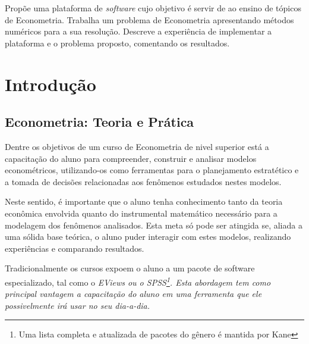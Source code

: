 \documentclass{abnt}
\begin{document}
\folhaderosto
\addtocounter{page}{1}

\vspace{4cm}
Propõe uma plataforma de \textit{software} cujo objetivo é servir de ao ensino de tópicos de Econometria. Trabalha um problema de Econometria apresentando métodos numéricos para a sua resolução. Descreve a experiência de implementar a plataforma e o problema proposto, comentando os resultados.


\newpage




\sumario

\chapter{Introdução}

\section{Econometria: Teoria e Prática}

Dentre os objetivos de um curso de Econometria de nivel superior está a capacitação do aluno para compreender, construir e analisar modelos econométricos, utilizando-os como ferramentas para o planejamento estratético e a tomada de decisões relacionadas aos fenômenos estudados nestes modelos.

Neste sentido, é importante que o aluno tenha conhecimento tanto da teoria econômica envolvida quanto do instrumental matemático necessário para a modelagem dos fenômenos analisados. Esta meta só pode ser atingida se, aliada a uma sólida base teórica, o aluno puder interagir com estes modelos, realizando experiências e comparando resultados.

Tradicionalmente os cursos expoem o aluno a um pacote de software especializado, tal como o \em{EViews} ou o \em{SPSS}\footnote{Uma lista completa e atualizada de pacotes do gênero é mantida por Kane\cite{web:econsoftware}}. Esta abordagem tem como principal vantagem a capacitação do aluno em uma ferramenta que ele possivelmente irá usar no seu dia-a-dia. 
\end{document}
